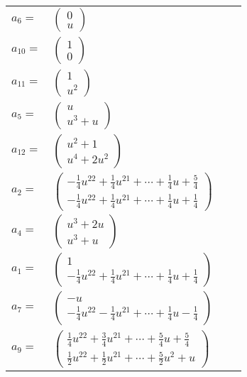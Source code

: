 \documentclass[1p]{elsarticle_modified}
\theoremstyle{definition}
\begin{document}
\begin{tabular}{m{7pt} m{180pt} m{7pt} m{180pt} }
\flushright $a_{6}=$&$\begin{pmatrix}0\\u\end{pmatrix}$ \\
\flushright $a_{10}=$&$\begin{pmatrix}1\\0\end{pmatrix}$ \\
\flushright $a_{11}=$&$\begin{pmatrix}1\\u^2\end{pmatrix}$ \\
\flushright $a_{5}=$&$\begin{pmatrix}u\\u^3+u\end{pmatrix}$ \\
\flushright $a_{12}=$&$\begin{pmatrix}u^2+1\\u^4+2 u^2\end{pmatrix}$ \\
\flushright $a_{2}=$&$\begin{pmatrix}-\frac{1}{4} u^{22}+\frac{1}{4} u^{21}+\cdots+\frac{1}{4} u+\frac{5}{4}\\-\frac{1}{4} u^{22}+\frac{1}{4} u^{21}+\cdots+\frac{1}{4} u+\frac{1}{4}\end{pmatrix}$ \\
\flushright $a_{4}=$&$\begin{pmatrix}u^3+2 u\\u^3+u\end{pmatrix}$ \\
\flushright $a_{1}=$&$\begin{pmatrix}1\\-\frac{1}{4} u^{22}+\frac{1}{4} u^{21}+\cdots+\frac{1}{4} u+\frac{1}{4}\end{pmatrix}$ \\
\flushright $a_{7}=$&$\begin{pmatrix}- u\\-\frac{1}{4} u^{22}-\frac{1}{4} u^{21}+\cdots+\frac{1}{4} u-\frac{1}{4}\end{pmatrix}$ \\
\flushright $a_{9}=$&$\begin{pmatrix}\frac{1}{4} u^{22}+\frac{3}{4} u^{21}+\cdots+\frac{5}{4} u+\frac{5}{4}\\\frac{1}{2} u^{22}+\frac{1}{2} u^{21}+\cdots+\frac{5}{2} u^2+u\end{pmatrix}$ \\

\end{tabular}
\end{document}
